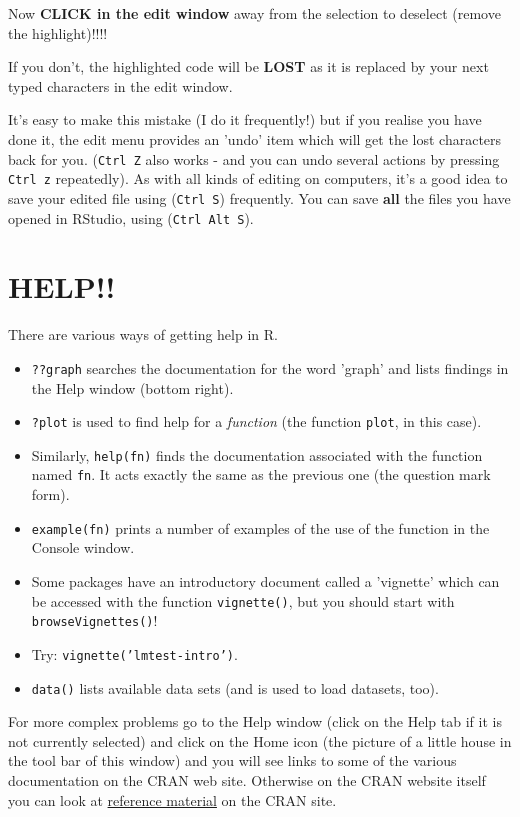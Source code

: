 \documentclass[titlepage]{book}
\begin{document}
  Now \textbf{CLICK in the edit window} away from the selection to deselect (remove the highlight)!!!!

  If you don't, the highlighted code will be \textbf{LOST} as it is replaced by your next typed characters in the edit window.

It's easy to make this mistake (I do it frequently!) but if you realise you have done it, the edit menu provides an 'undo' item which will get the lost characters back for you. (\texttt{Ctrl Z} also works - and you can undo several actions by pressing \texttt{Ctrl z} repeatedly). As with all kinds of editing on computers, it's a good idea to save your edited file using (\texttt{Ctrl S}) frequently. You can save \textbf{all} the files you have opened in RStudio, using (\texttt{Ctrl Alt S}).

\section{HELP!!}
There are various ways of getting help in R.
\begin{itemize}
\item{\texttt{??graph} searches the documentation for the word 'graph' and lists findings in the Help window (bottom right).}
\item{\texttt{?plot} is used to find help for a \emph{function} (the function \texttt{plot}, in this case). }
\item{Similarly, \texttt{help(fn)} finds the documentation associated with the function named \texttt{fn}. It acts exactly the same as the previous one (the question mark form).}

\item{\texttt{example(fn)}  prints a number of examples of the use of the function in the Console window.}
\item{Some packages have an introductory document called a 'vignette' which can be accessed with the function \texttt{vignette()}, but you should start with \texttt{browseVignettes()}!}
\item{Try: \texttt{vignette('lmtest-intro')}.}
\item{\texttt{data()} lists available data sets (and is used to load datasets, too).}
\end{itemize}

For more complex problems go to the Help window (click on the Help tab if it is not currently selected) and click on the Home icon (the picture of a little house in the tool bar of this window) and you will see links  to some of the various documentation on the CRAN web site.
Otherwise on the CRAN website itself you can look at \href{http://cran.r-project.org/doc/contrib/Torfs+Brauer-Short-R-Intro.pdf}{reference material} on the CRAN site.
\end{document}
